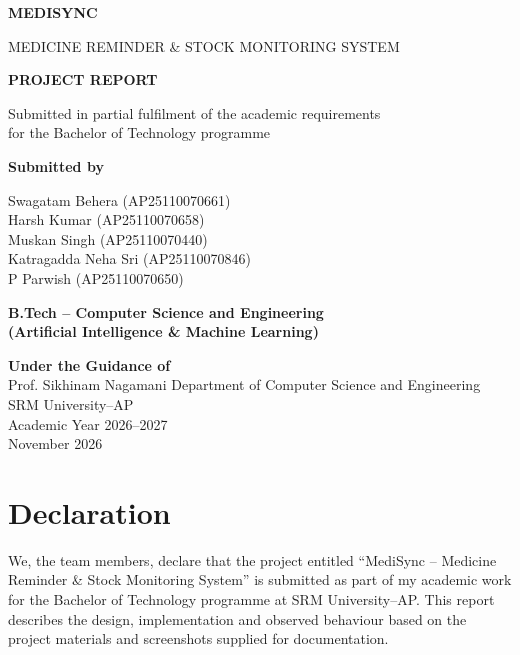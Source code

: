 \documentclass[12pt,a4paper,oneside]{report}
\begin{document}
\begin{titlepage}
\centering
\vspace*{1.5cm}
{\Huge\bfseries MEDISYNC\par}
\vspace{0.4cm}
{\Large MEDICINE REMINDER \& STOCK MONITORING SYSTEM\par}
\vspace{1.5cm}
{\Large\bfseries PROJECT REPORT\par}
\vspace{1cm}
Submitted in partial fulfilment of the academic requirements\\
for the Bachelor of Technology programme
\vspace{1.2cm}

\textbf{Submitted by}\\[0.3cm]

\begin{center}
\large
Swagatam Behera (AP25110070661)\\[0.12cm]
Harsh Kumar (AP25110070658)\\[0.12cm]
Muskan Singh (AP25110070440)\\[0.12cm]
Katragadda Neha Sri (AP25110070846)\\[0.12cm]
P Parwish (AP25110070650)
\end{center}

\vspace{0.3cm}

\textbf{B.Tech -- Computer Science and Engineering}\\
\textbf{(Artificial Intelligence \& Machine Learning)}

\vspace{0.8cm}

\textbf{Under the Guidance of}\\[0.2cm]

{\Large Prof. Sikhinam Nagamani}
\vfill
Department of Computer Science and Engineering\\
SRM University--AP\\
Academic Year 2026--2027\\[0.5cm]
November 2026
\end{titlepage}

\chapter*{Declaration}
We, the team members, declare that the project entitled ``MediSync -- Medicine Reminder \& Stock Monitoring System'' is submitted as part of my academic work for the Bachelor of Technology programme at SRM University--AP. This report describes the design, implementation and observed behaviour based on the project materials and screenshots supplied for documentation.
\end{document}
